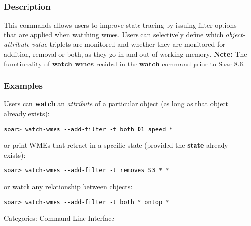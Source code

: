 \subsubsection*{Description}
 This commands allows users to improve state tracing by issuing filter-options that are applied when watching wmes. Users can selectively define which \emph{object-attribute-value}
 triplets are monitored and whether they are monitored for addition, removal or both, as they go in and out of working memory. 
 \textbf{Note:}
 The functionality of \textbf{watch-wmes}
 resided in the \textbf{watch}
 command prior to Soar 8.6. 
\subsubsection*{Examples}
 Users can \textbf{watch}
 an \emph{attribute}
 of a particular object (as long as that object already exists):  \begin{verbatim}
soar> watch-wmes --add-filter -t both D1 speed *
\end{verbatim}
 or print WMEs that retract in a specific state (provided the \textbf{state}
 already exists):  \begin{verbatim}
soar> watch-wmes --add-filter -t removes S3 * *
\end{verbatim}
  or watch any relationship between objects:  \begin{verbatim}
soar> watch-wmes --add-filter -t both * ontop *
\end{verbatim}
 Categories: Command Line Interface
